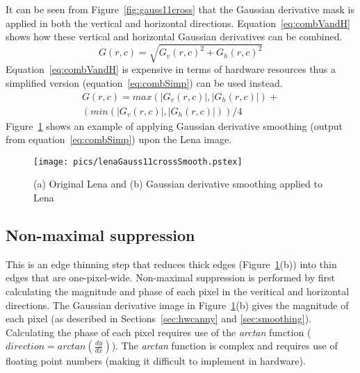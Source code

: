 \documentclass[10pt,twocolumn,letterpaper]{article}
\begin{document}
It can be seen from Figure~\ref{fig:gauss11cross} that the Gaussian derivative mask is applied in both the vertical and horizontal 
directions. 
Equation~\ref{eq:combVandH} shows how these vertical and horizontal Gaussian derivatives can be combined.
\begin{equation}
\label{eq:combVandH}
G(r,c)=\sqrt{G_{v}(r,c)^{2} + G_{h}(r,c)^{2}}
\end{equation}
Equation~\ref{eq:combVandH} is expensive in terms of hardware resources thus a simplified
version (equation~\ref{eq:combSimp}) can be used instead.
\begin{eqnarray}
\label{eq:combSimp}
  G(r,c) = max(|G_{v}(r,c)|, |G_{h}(r,c)|) + \nonumber \\
   \left(min(|G_{v}(r,c)|,|G_{h}(r,c)|)\right) / 4
\end{eqnarray}
Figure~\ref{fig:LenaGauss11} shows an example of applying Gaussian derivative smoothing (output from equation~\ref{eq:combSimp})
upon the Lena image. 
\begin{figure}[!htb]
\begin{center}
\setlength{\abovecaptionskip}{-0.25cm}
        \texttt{[image: pics/lenaGauss11crossSmooth.pstex]}
        \caption{(a) Original Lena and (b) Gaussian derivative smoothing applied to Lena}
        \label{fig:LenaGauss11}
\setlength{\abovecaptionskip}{0cm}
\end{center}
\end{figure}

\subsection{Non-maximal suppression}
This is an edge thinning step that reduces thick edges (Figure~\ref{fig:LenaGauss11}(b)) into thin edges that are one-pixel-wide.
Non-maximal suppression is performed by first calculating the magnitude and phase of
each pixel in the veritical and horizontal directions. 
The Gaussian derivative image in Figure~\ref{fig:LenaGauss11}(b) gives the magnitude
of each pixel (as described in Sections~\ref{sec:hwcanny} and \ref{sec:smoothing}). Calculating the phase of 
each pixel requires use of the \emph{arctan} function 
($direction=arctan\left(\frac{dy}{dx}\right)$).
The \emph{arctan} function is complex and requires use of floating point numbers
(making it difficult to implement in hardware).
\end{document}
